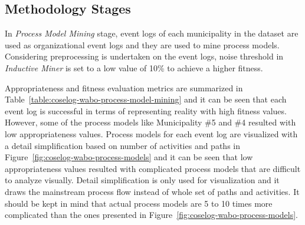 \subsection{Methodology Stages}
\label{sec:coselog-methodology}
In \textit{Process Model Mining} stage, event logs of each municipality in the dataset are used as organizational event logs and they are used to mine process models. Considering preprocessing is undertaken on the event logs, noise threshold in \textit{Inductive Miner} is set to a low value of 10\% to achieve a higher fitness. 

Appropriateness and fitness evaluation metrics are summarized in Table~\ref{table:coselog-wabo-process-model-mining} and it can be seen that each event log is successful in terms of representing reality with high fitness values. However, some of the process models like Municipality \#5 and \#4 resulted with low appropriateness values. Process models for each event log are visualized with a detail simplification based on number of activities and paths in Figure~\ref{fig:coselog-wabo-process-models} and it can be seen that low appropriateness values resulted with complicated process models that are difficult to analyze visually. Detail simplification is only used for visualization and it draws the mainstream process flow instead of whole set of paths and activities. It should be kept in mind that actual process models are 5 to 10 times more complicated than the ones presented in Figure~\ref{fig:coselog-wabo-process-models}.


